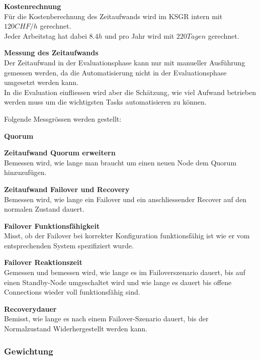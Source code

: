 \begin{flushleft}
    \begin{description}
        \item \textbf{Kostenrechnung}\hfill \\Für die Kostenberechnung des Zeitaufwands wird im KSGR intern mit \(120CHF/h\) gerechnet.\\Jeder Arbeitstag hat dabei \(8.4h\) und pro Jahr wird mit \(220 Tagen\) gerechnet.
        \item \textbf{Messung des Zeitaufwands}\hfill \\Der Zeitaufwand in der Evaluationsphase kann nur mit manueller Ausführung gemessen werden, da die Automatisierung nicht in der Evaluationsphase umgesetzt werden kann.\\In die Evaluation einfliessen wird aber die Schätzung, wie viel Aufwand betrieben werden muss um die wichtigsten Tasks automatisieren zu können.
        \item 
    \end{description}

    Folgende Messgrössen werden gestellt:
    \begin{description}
        \item \textbf{Quorum}\hfill \\
        \item \textbf{Zeitaufwand Quorum erweitern}\hfill \\Bemessen wird, wie lange man braucht um einen neuen Node dem Quorum hinzuzufügen.
        \item \textbf{Zeitaufwand Failover und Recovery}\hfill \\Bemessen wird, wie lange ein Failover und ein anschliessender Recover auf den normalen Zustand dauert.
        \item \textbf{Failover Funktionsfähigkeit}\hfill \\Misst, ob der Failover bei korrekter Konfiguration funktionsfähig ist wie er vom entsprechenden System spezifiziert wurde.
        \item \textbf{Failover Reaktionszeit}\hfill \\Gemessen und bemessen wird, wie lange es im Failoverszenario dauert, bis auf einen Standby-Node umgeschaltet wird und wie lange es dauert bis offene Connections wieder voll funktionsfähig sind.
        \item \textbf{Recoverydauer}\hfill \\Bemisst, wie lange es nach einem Failover-Szenario dauert, bis der Normalzustand Widerhergestellt werden kann.
    \end{description}


\end{flushleft}
\subsubsection{Gewichtung}
\begin{flushleft}
\end{flushleft}